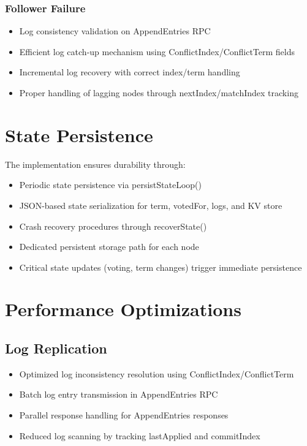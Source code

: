 \documentclass{article}
\begin{document}
\subsubsection{Follower Failure}
\begin{itemize}
    \item Log consistency validation on AppendEntries RPC
    \item Efficient log catch-up mechanism using ConflictIndex/ConflictTerm fields
    \item Incremental log recovery with correct index/term handling
    \item Proper handling of lagging nodes through nextIndex/matchIndex tracking
\end{itemize}

\section{State Persistence}
The implementation ensures durability through:
\begin{itemize}
    \item Periodic state persistence via persistStateLoop()
    \item JSON-based state serialization for term, votedFor, logs, and KV store
    \item Crash recovery procedures through recoverState()
    \item Dedicated persistent storage path for each node
    \item Critical state updates (voting, term changes) trigger immediate persistence
\end{itemize}

\section{Performance Optimizations}

\subsection{Log Replication}
\begin{itemize}
    \item Optimized log inconsistency resolution using ConflictIndex/ConflictTerm
    \item Batch log entry transmission in AppendEntries RPC
    \item Parallel response handling for AppendEntries responses
    \item Reduced log scanning by tracking lastApplied and commitIndex
\end{itemize}
\end{document}
